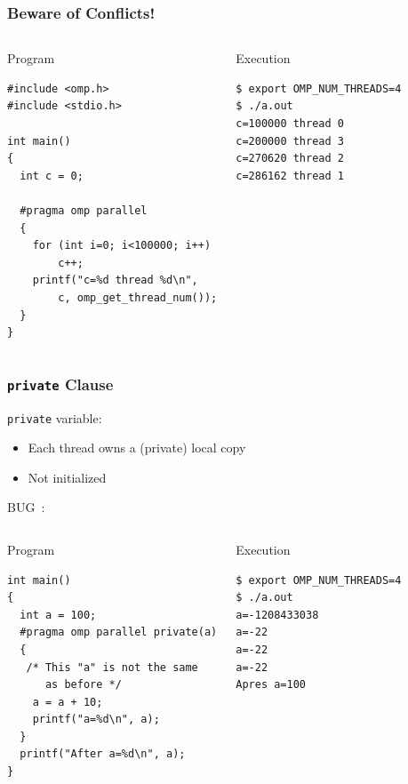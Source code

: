 \documentclass{beamer}
\begin{document}
\begin{frame}[fragile=singleslide]
  \frametitle{Beware of Conflicts!}
  
  \small
  \begin{columns}[t]
  \column{5cm}
\begin{block}{Program}
\begin{verbatim}
#include <omp.h>
#include <stdio.h>

int main()
{
  int c = 0;

  #pragma omp parallel
  {  
    for (int i=0; i<100000; i++)
        c++;
    printf("c=%d thread %d\n", 
        c, omp_get_thread_num());
  }
}
\end{verbatim}
\end{block}
    
    
    \column{5cm}
\begin{block}{Execution}    
\begin{verbatim}
$ export OMP_NUM_THREADS=4
$ ./a.out
c=100000 thread 0
c=200000 thread 3
c=270620 thread 2
c=286162 thread 1
\end{verbatim}
\end{block}    
  \end{columns}
\normalsize
\end{frame}


\begin{frame}[fragile=singleslide]
  \frametitle{\texttt{private} Clause}

 \texttt{private} variable:
  \begin{itemize}
  \item Each thread owns a (private) local copy
  \item \alert{Not initialized}
  \end{itemize}

\medskip

BUG~:
\begin{columns}[t]
  \column{5cm}
  
\begin{block}{Program}
\begin{verbatim}
int main()
{
  int a = 100;
  #pragma omp parallel private(a)
  {
   /* This "a" is not the same
      as before */
    a = a + 10;
    printf("a=%d\n", a);
  }
  printf("After a=%d\n", a);
}
\end{verbatim}
\end{block}

  
  \column{5cm}
\begin{block}{Execution}
\small
\begin{verbatim} 
$ export OMP_NUM_THREADS=4
$ ./a.out 
a=-1208433038
a=-22
a=-22
a=-22
Apres a=100
\end{verbatim}
\end{block}  
\end{columns}
\end{frame}
\end{document}
